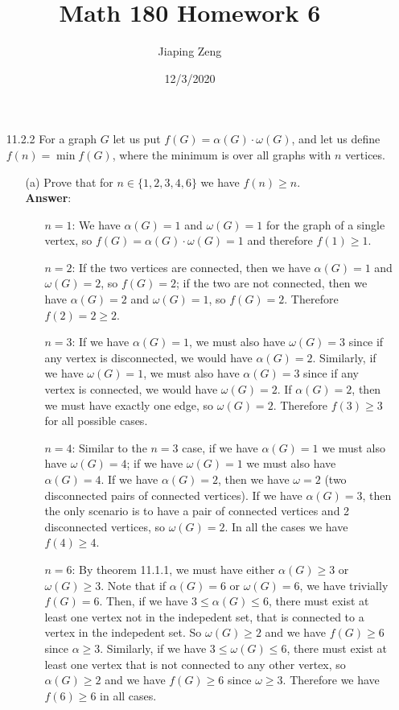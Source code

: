\documentclass{article}
\title{Math 180 Homework 6}
\date{12/3/2020}
\author{Jiaping Zeng}
\begin{document}
\maketitle

\begin{itemize}
    \item [11.2.2] For a graph $G$ let us put $f(G)=\alpha(G)\cdot\omega(G)$, and let us define $f(n)=\min f(G)$, where the minimum is over all graphs with $n$ vertices.
          \begin{itemize}
              \item [(a)] Prove that for $n\in\{1,2,3,4,6\}$ we have $f(n)\geq n$.\\
                    \textbf{Answer}:
                    \begin{itemize}
                        \item [$n=1$:] We have $\alpha(G)=1$ and $\omega(G)=1$ for the graph of a single vertex, so $f(G)=\alpha(G)\cdot\omega(G)=1$ and therefore $f(1)\geq 1$.
                        \item [$n=2$:] If the two vertices are connected, then we have $\alpha(G)=1$ and $\omega(G)=2$, so $f(G)=2$; if the two are not connected, then we have $\alpha(G)=2$ and $\omega(G)=1$, so $f(G)=2$. Therefore $f(2)=2\geq 2$.
                        \item [$n=3$:] If we have $\alpha(G)=1$, we must also have $\omega(G)=3$ since if any vertex is disconnected, we would have $\alpha(G)=2$. Similarly, if we have $\omega(G)=1$, we must also have $\alpha(G)=3$ since if any vertex is connected, we would have $\omega(G)=2$. If $\alpha(G)=2$, then we must have exactly one edge, so $\omega(G)=2$. Therefore $f(3)\geq 3$ for all possible cases.
                        \item [$n=4$:] Similar to the $n=3$ case, if we have $\alpha(G)=1$ we must also have $\omega(G)=4$; if we have $\omega(G)=1$ we must also have $\alpha(G)=4$. If we have $\alpha(G)=2$, then we have $\omega=2$ (two disconnected pairs of connected vertices). If we have $\alpha(G)=3$, then the only scenario is to have a pair of connected vertices and 2 disconnected vertices, so $\omega(G)=2$. In all the cases we have $f(4)\geq 4$.
                        \item [$n=6$:] By theorem 11.1.1, we must have either $\alpha(G)\geq 3$ or $\omega(G)\geq 3$. Note that if $\alpha(G)=6$ or $\omega(G)=6$, we have trivially $f(G)=6$. Then, if we have $3\leq\alpha(G)\leq 6$, there must exist at least one vertex not in the indepedent set, that is connected to a vertex in the indepedent set. So $\omega(G)\geq 2$ and we have $f(G)\geq 6$ since $\alpha\geq 3$. Similarly, if we have $3\leq\omega(G)\leq 6$, there must exist at least one vertex that is not connected to any other vertex, so $\alpha(G)\geq 2$ and we have $f(G)\geq 6$ since $\omega\geq 3$. Therefore we have $f(6)\geq 6$ in all cases.

\end{itemize}
\end{itemize}
\end{itemize}
\end{document}
